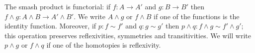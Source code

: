 \documentclass{article}
\newcommand{\pmap}{\to}
\newcommand{\smsh}{\wedge}
\renewcommand{\o}{\ensuremath{\circ}}
\begin{document}
\begin{lem}\label{lem:smash-general}
	The smash product is functorial: if $f:A\pmap A'$ and $g:B\pmap B'$ then
    $f\smsh g:A\smsh B\pmap A'\smsh B'$. We write $A\smsh g$ or $f\smsh B$ if one of the
    functions is the identity function. Moreover, if $p:f\sim f'$ and $q:g\sim g'$ then $p\smsh q:f\smsh g\sim f'\smsh g'$; this operation preserves reflexivities, symmetries and transitivities. We will write $p \smsh g$ or $f \smsh q$ if one of the homotopies is reflexivity.
\end{lem}
\end{document}
